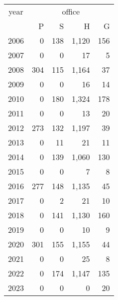 \footnotesize\begin{tabular}[t]{lrrrr}
\toprule
\multicolumn{1}{c}{year} & \multicolumn{4}{c}{office} \\
\cmidrule(l{3pt}r{3pt}){1-1} \cmidrule(l{3pt}r{3pt}){2-5}
  & P & S & H & G\\
\midrule
2006 & 0 & 138 & 1,120 & 156\\
2007 & 0 & 0 & 17 & 5\\
2008 & 304 & 115 & 1,164 & 37\\
2009 & 0 & 0 & 16 & 14\\
2010 & 0 & 180 & 1,324 & 178\\
2011 & 0 & 0 & 13 & 20\\
2012 & 273 & 132 & 1,197 & 39\\
2013 & 0 & 11 & 21 & 11\\
2014 & 0 & 139 & 1,060 & 130\\
2015 & 0 & 0 & 7 & 8\\
2016 & 277 & 148 & 1,135 & 45\\
2017 & 0 & 2 & 21 & 10\\
2018 & 0 & 141 & 1,130 & 160\\
2019 & 0 & 0 & 10 & 9\\
2020 & 301 & 155 & 1,155 & 44\\
2021 & 0 & 0 & 25 & 8\\
2022 & 0 & 174 & 1,147 & 135\\
2023 & 0 & 0 & 0 & 20\\
\bottomrule
\end{tabular}
